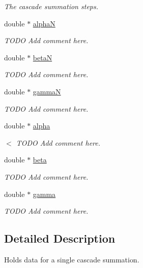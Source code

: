 \begin{CompactItemize}
\begin{CompactList}\small\item\em The cascade summation steps. \item\end{CompactList}\item 
double $\ast$ \hyperlink{structfpt__data_eafd070ebb2e7c345750303d34a68890}{alphaN}
\begin{CompactList}\small\item\em TODO Add comment here. \item\end{CompactList}\item 
double $\ast$ \hyperlink{structfpt__data_eace6f72b465a9bd2d8c399c69b7d9a9}{betaN}
\begin{CompactList}\small\item\em TODO Add comment here. \item\end{CompactList}\item 
double $\ast$ \hyperlink{structfpt__data_a6986fbcdce61cdbaf09c92632880feb}{gammaN}
\begin{CompactList}\small\item\em TODO Add comment here. \item\end{CompactList}\item 
double $\ast$ \hyperlink{structfpt__data_e132db4edcdbf60c1f61760e3f595259}{alpha}
\begin{CompactList}\small\item\em $<$ TODO Add comment here. \item\end{CompactList}\item 
double $\ast$ \hyperlink{structfpt__data_ba9cfecd384591c476464842ed5ddb2d}{beta}
\begin{CompactList}\small\item\em TODO Add comment here. \item\end{CompactList}\item 
double $\ast$ \hyperlink{structfpt__data_44795aeed3218709fa139025fcd22451}{gamma}
\begin{CompactList}\small\item\em TODO Add comment here. \item\end{CompactList}\end{CompactItemize}


\subsection{Detailed Description}
Holds data for a single cascade summation. 


